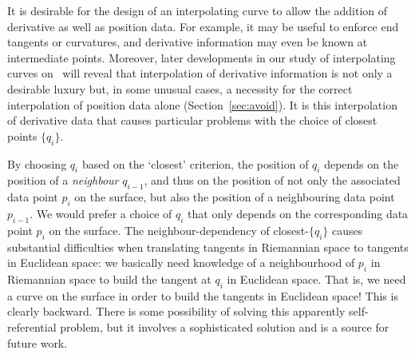It is desirable for the design of an interpolating curve to allow the 
addition of derivative as well as position data.
For example, it may be useful to enforce end tangents or curvatures,
and derivative information may even be known at intermediate points.
Moreover, later developments in our study of interpolating curves on \ will
reveal that interpolation of derivative information is not only a desirable 
luxury but, in some unusual cases, a necessity for the correct 
interpolation of position data alone (Section~\ref{sec:avoid}).
It is this interpolation of derivative data that causes particular problems
with the choice of closest points $\{q_i\}$.

By choosing $q_i$ based on the `closest' criterion,
the position of $q_i$ depends on the position of a {\em neighbour} $q_{i-1}$,
and thus on the position of not only the associated data point $p_i$ on the
surface, but also the position of a neighbouring data point $p_{i-1}$.
We would prefer a choice of $q_i$ that only depends on the corresponding
data point $p_i$ on the surface.
The neighbour-dependency of closest-$\{q_i\}$
causes substantial difficulties when translating tangents in Riemannian space
to tangents in Euclidean space: 
we basically need knowledge of a neighbourhood of $p_i$ in Riemannian space
to build the tangent at $q_i$ in Euclidean space.
That is, we need a curve on the surface in order to build the tangents
in Euclidean space!
This is clearly backward.
There is some possibility of solving this apparently self-referential problem,
but it involves a sophisticated solution and is a source for future work.
%
%
%

